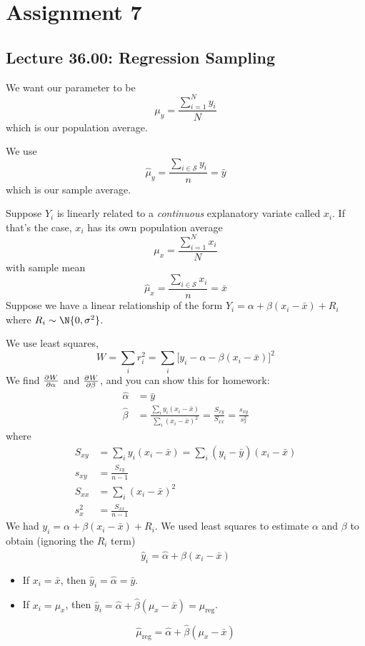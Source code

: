\chapter{Assignment 7}
\section{Lecture 36.00: Regression Sampling}
We want our parameter to be
\[ \mu_y = \frac{\sum_{i=1}^{N} y_i}{N}  \]
which is our population average.

We use
\[ \hat{\mu}_y=\frac{\sum_{i\in\mathcal{S}}y_i}{n}=\bar{y}  \]
which is our sample average.

Suppose $ Y_i $ is linearly related to a \emph{continuous}
explanatory variate called $ x_i $. If that's the case,
$ x_i $ has its own population average
\[ \mu_x= \frac{\sum_{i=1}^{N} x_i}{N} \]
with sample mean
\[ \hat{\mu}_x=\frac{\sum_{i\in\mathcal{S}} x_i }{n}=\bar{x}  \]
Suppose we have a linear relationship of the form
$ Y_i=\alpha+\beta(x_i-\bar{x})+R_i $ where $ R_i \sim \N{0,\sigma^2} $.

We use least squares,
\[ W=\sum_{i}r_i^2=\sum_{i}\bigl[y_i-\alpha-\beta(x_i-\bar{x})\bigr]^2  \]
We find $\pd{W}{\alpha}$ and $\pd{W}{\beta}$, and you can show this for homework:
\begin{align*}
    \hat{\alpha} & =\bar{y}                                                                                                \\
    \hat{\beta}  & =\frac{\sum_{i}y_i(x_i-\bar{x})}{\sum_{i}(x_i-\bar{x})^2 }=\frac{S_{xy}}{S_{xx}}=\frac{s_{xy}}{s_{x}^2}
\end{align*}
where
\begin{align*}
    S_{xy}  & =\sum_{i}y_i(x_i-\bar{x})=\sum_{i}(y_i-\bar{y})(x_i-\bar{x}) \\
    s_{xy}  & =\frac{S_{xy}}{n-1}                                          \\
    S_{xx}  & =\sum_{i}(x_i-\bar{x})^2                                     \\
    s_{x}^2 & =\frac{S_{xx}}{n-1}
\end{align*}
We had $ y_i=\alpha+\beta(x_i-\bar{x})+R_i $. We used least squares
to estimate $ \alpha $ and $ \beta $ to obtain (ignoring the $ R_i $ term)
\[ \hat{y}_i=\hat{\alpha}+\hat{\beta}(x_i-\bar{x}) \]
\begin{itemize}
    \item If $ x_i=\bar{x} $, then $ \hat{y}_i=\hat{\alpha}=\bar{y} $.
    \item If $ x_i=\mu_x $, then $ \hat{y}_i=\hat{\alpha}+\hat{\beta}(\mu_x-\bar{x})=\hat{\mu}_{\text{reg}} $.
\end{itemize}
\[ \boxed{\hat{\mu}_{\text{reg}}=\hat{\alpha}+\hat{\beta}(\mu_x-\bar{x})} \]
